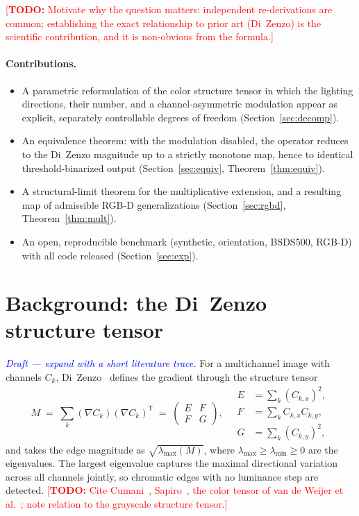 \documentclass[11pt,a4paper]{article}
\newcommand{\todo}[1]{\textcolor{red}{[\textbf{TODO:} #1]}}
\newcommand{\note}[1]{\textcolor{blue}{\textit{#1}}}
\theoremstyle{plain}
\theoremstyle{definition}
\newcommand{\grad}{\nabla}
\newcommand{\lmax}{\lambda_{\max}}
\newcommand{\lmin}{\lambda_{\min}}
\newcommand{\transpose}{^{\mathsf T}}
\begin{document}
\todo{Motivate why the question matters: independent re-derivations are common;
establishing the exact relationship to prior art (Di~Zenzo) is the scientific
contribution, and it is non-obvious from the formula.}

\paragraph{Contributions.}
\begin{itemize}
  \item A parametric reformulation of the color structure tensor in which the
        lighting directions, their number, and a channel-asymmetric modulation
        appear as explicit, separately controllable degrees of freedom
        (Section~\ref{sec:decomp}).
  \item An equivalence theorem: with the modulation disabled, the operator
        reduces to the Di~Zenzo magnitude up to a strictly monotone map, hence
        to identical threshold-binarized output (Section~\ref{sec:equiv},
        Theorem~\ref{thm:equiv}).
  \item A structural-limit theorem for the multiplicative extension, and a
        resulting map of admissible RGB-D generalizations
        (Section~\ref{sec:rgbd}, Theorem~\ref{thm:mult}).
  \item An open, reproducible benchmark (synthetic, orientation, BSDS500,
        RGB-D) with all code released (Section~\ref{sec:exp}).
\end{itemize}

\section{Background: the Di~Zenzo structure tensor}
\label{sec:background}

\note{Draft --- expand with a short literature trace.}
For a multichannel image with channels $C_k$, Di~Zenzo~\cite{dizenzo1986}
defines the gradient through the structure tensor
\begin{equation}
\label{eq:dz-tensor}
M \;=\; \sum_{k} (\grad C_k)(\grad C_k)\transpose
\;=\;
\begin{pmatrix} E & F \\ F & G \end{pmatrix},
\quad
\begin{aligned}
E &= \textstyle\sum_k (C_{k,x})^2,\\
F &= \textstyle\sum_k C_{k,x} C_{k,y},\\
G &= \textstyle\sum_k (C_{k,y})^2,
\end{aligned}
\end{equation}
and takes the edge magnitude as $\sqrt{\lmax(M)}$, where $\lmax \ge \lmin \ge 0$
are the eigenvalues. The largest eigenvalue captures the maximal directional
variation across all channels jointly, so chromatic edges with no luminance
step are detected. \todo{Cite Cumani~\cite{cumani1991}, Sapiro~\cite{sapiro1996},
the color tensor of van de Weijer et al.~\cite{weijer2006}; note relation to
the grayscale structure tensor.}
\end{document}
